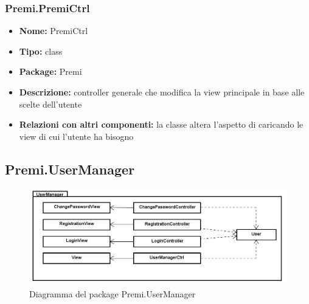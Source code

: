 \subsubsection{Premi.PremiCtrl}
\begin{itemize}
  \item \textbf{Nome:} PremiCtrl
  \item \textbf{Tipo:} class
  \item \textbf{Package:} Premi
  \item \textbf{Descrizione:} controller generale che modifica la view principale in base alle scelte dell'utente
  \item \textbf{Relazioni con altri componenti:} la classe altera l'aspetto di  caricando le view di cui l'utente ha bisogno 
\end{itemize}

\subsection{Premi.UserManager}
\begin{figure}[h]
\begin{center}
\includegraphics[scale=0.45]{img/diapkg/usermanager-class.jpg}
\caption{Diagramma del package Premi.UserManager}
\end{center}
\end{figure}
\clearpage
